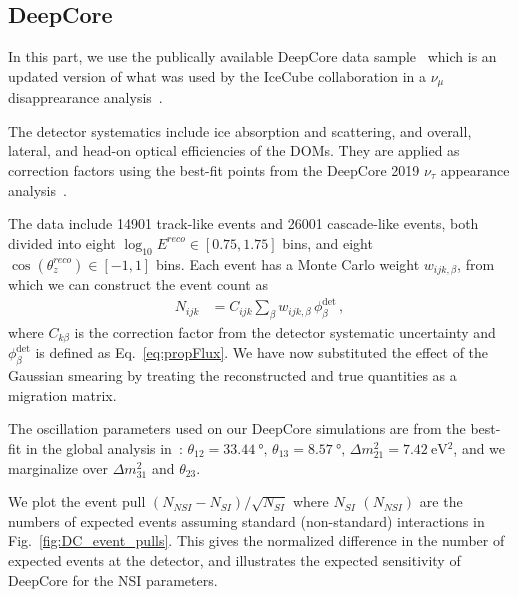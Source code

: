 \documentclass[draft=True]{revtex4-2}
\newcommand{\zreco}{\ensuremath{\cos{(\theta_z^{reco})}}}
\newcommand{\dm}{\Delta m^2_{31}}
\begin{document}
\subsection{DeepCore}\label{ch:DCmethod}
In this part, we use the publically available DeepCore data sample~\cite{DC2019data} which is an updated version of what was used by the 
IceCube collaboration in a $\nu_\mu$ disapprearance analysis~\cite{DC2018mudisappearance}.

The detector systematics include ice absorption and scattering, and overall, lateral, and head-on optical efficiencies of the DOMs. 
They are applied as correction factors using the best-fit points from the DeepCore 2019 $\nu_\tau$ appearance 
analysis~\cite{DC2019tauappearance}.

The data include 14901 track-like events and 26001 cascade-like events, both divided into eight 
$ \log_{10}E^{reco} \in [0.75,1.75]$ bins, and eight $\zreco \in [-1,1]$ bins. Each event has a Monte Carlo weight $w_{ijk,\beta}$,
from which we can construct the event count as
\begin{align}\label{eq:MCevents}
    N_{ijk} &= C_{ijk}\sum_{\beta}w_{ijk,\beta}\, \phi_\beta^\text{det}\,,
\end{align}
where $C_{k\beta}$ is the correction factor from the detector systematic uncertainty and $\phi_\beta^\text{det}$ is defined as Eq.~\ref{eq:propFlux}. We have now substituted the effect of the Gaussian smearing 
by treating the reconstructed and true quantities as a migration matrix. 

The oscillation parameters used on our DeepCore simulations are from the
best-fit in the global analysis in~\cite{nufit}: $\theta_{12} = \SI{33.44}{\degree},\, \theta_{13} = \SI{8.57}{\degree},\, \Delta m^2_{21} =  \SI{7.42}{\electronvolt^2}$, and we 
marginalize over $\dm$ and $\theta_{23}$.

We plot the event pull $(N_{NSI} - N_{SI})/\sqrt{N_{SI}}$ where $N_{SI}$ $(N_{NSI})$ are the numbers of expected events
assuming standard (non-standard) interactions in Fig.~\ref{fig:DC_event_pulls}. This gives the normalized difference in the
number of expected events at the detector, and illustrates the expected sensitivity of DeepCore for the NSI parameters.
\end{document}
